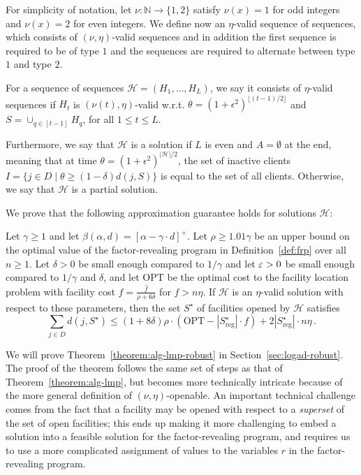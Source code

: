 For simplicity of notation, let $\nu : \mathbb{N} \to \{1,2\}$ satisfy $\nu(x) = 1$ for odd integers and $\nu(x)=2$ for even integers.
We define now an $\eta$-valid sequence of sequences, which consists of $(\nu,\eta)$-valid sequences and in addition the first sequence is required to be of type $1$ and the sequences are required to alternate between type $1$ and type $2$.

\begin{definition}
\label{def:valid-seq-of-seq}
For a sequence of sequences $\mathcal{H} = (H_1, \ldots, H_L)$, we say it consists of $\eta$-valid sequences if $H_{t}$ is $(\nu(t), \eta)$-valid w.r.t. $\theta = (1+\epsilon^2)^{\lfloor (t-1)/2 \rfloor}$ and $S = \cup_{q \in [t - 1]} H_q$, for all $1 \leq t \leq L$.
\end{definition}
Furthermore, we say that $\mathcal{H}$ is a solution if $L$ is even and $A = \emptyset$ at the end, meaning that at time $\theta=(1+\epsilon^2)^{|\mathcal{H}| / 2}$, the set of inactive clients $I = \{j \in D \mid \theta \geq (1-\delta) d(j, S)\}$ is equal to the set of all clients.
Otherwise, we say that $\mathcal{H}$ is a partial solution.

We prove that the following approximation guarantee holds for solutions $\mathcal{H}$:

\begin{theorem}
\label{theorem:alg-lmp-robust}
Let $\gamma \geq 1$ and let $\beta(\alpha,d) = [\alpha - \gamma \cdot d]^+$. Let $\rho \geq 1.01 \gamma$ be an upper bound on the optimal value of the factor-revealing program in Definition~\ref{def:frp} over all $n \geq 1$.
Let $\delta > 0$ be small enough compared to $1/\gamma$ and let $\varepsilon > 0$ be small enough compared to $1/\gamma$ and $\delta$,
and let $\mathrm{OPT}$ be the optimal cost to the facility location problem with facility cost $f = \frac{\hat{f}}{\rho + 6 \delta}$ for $\hat f > n \eta$.
If $\mathcal{H}$ is an $\eta$-valid solution with respect to these parameters, then the set $S^\star$ of facilities opened by $\mathcal{H}$ satisfies
\[\sum_{j \in D} d(j, S^\star) \leq (1+8\delta) \rho \cdot (\mathrm{OPT} - |S^\star_{\mathrm{reg}}| \cdot f) + 2 |S^\star_{\mathrm{reg}}| \cdot n \eta\,.\]
\end{theorem}

We will prove Theorem~\ref{theorem:alg-lmp-robust} in Section~\ref{sec:logad-robust}.
The proof of the theorem follows the same set of steps as that of Theorem~\ref{theorem:alg-lmp}, but becomes more technically intricate because of the more general definition of $(\nu,\eta)$-openable.
An important technical challenge comes from the fact that a facility may be opened with respect to a \emph{superset} of the set of open facilities; this ends up making it more challenging to embed a solution into a feasible solution for the factor-revealing program, and requires us to use a more complicated assignment of values to the variables $r$ in the factor-revealing program.

